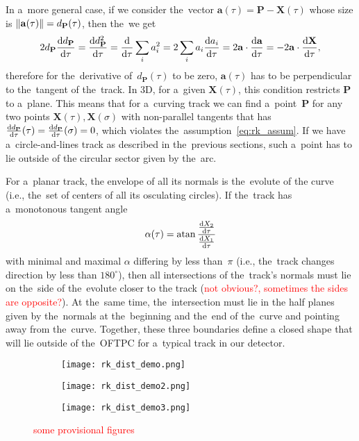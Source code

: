 		In a~more general case, if we consider the~vector $\mathbf{a}(\tau) = \mathbf{P}-\mathbf{X}(\tau)$ whose size is $\norm{\mathbf{a}(\tau)} = d_\mathbf{P}(\tau)$, then the~we get
			\begin{equation}
				2d_{\mathbf{P}}\dv{d_{\mathbf{P}}}{\tau}= \dv{d^2_{\mathbf{P}}}{\tau} = \dv{}{\tau} \sum_i a_i^2 = 2\sum_i a_i\dv{a_i}{\tau} = 2\mathbf{a}\cdot\dv{\mathbf{a}}{\tau} = -2\mathbf{a}\cdot\dv{\mathbf{X}}{\tau},
			\end{equation}
		therefore for the~derivative of~$d_\mathbf{P}(\tau)$ to be zero, $\mathbf{a}(\tau)$ has to be perpendicular to the~tangent of the~track. In 3D, for a~given $\mathbf{X}(\tau)$, this condition restricts $\mathbf{P}$ to a~plane. This means that for a~curving track we can find a~point~$\mathbf{P}$ for any two points $\mathbf{X}(\tau),\mathbf{X}(\sigma)$ with non-parallel tangents that has $\dv{d_{\mathbf{P}}}{\tau}{(\tau)} = \dv{d_{\mathbf{P}}}{\tau}{(\sigma)} = 0$, which violates the~assumption~\ref{eq:rk_assum}. If we have a~circle-and-lines track as described in the~previous sections, such a~point has to lie outside of the circular sector given by the~arc.
		
		For a~planar track, the envelope of all its normals is the~evolute of the curve (i.e., the~set of centers of all its osculating circles). If the~track has a~monotonous tangent angle
			\begin{equation}
				\alpha(\tau) = \atan{\frac{\dv{X_2}{\tau}}{\dv{X_1}{\tau}}}
			\end{equation}
		with minimal and maximal $\alpha$ differing by less than~$\pi$ (i.e., the~track changes direction by less than $180^\circ$), then all intersections of the~track's normals must lie on the~side of the~evolute closer to the track (\textcolor{red}{not obvious?, sometimes the sides are opposite?}). At the~same time, the~intersection must lie in the half planes given by the~normals at the~beginning and the~end of the~curve and pointing away from the~curve. Together, these three boundaries define a closed shape that will lie outside of the~\ac{OFTPC} for a~typical track in our detector.
			\begin{figure}
				\centering
				\begin{subfigure}[t]{0.49\textwidth}
					\centering
					\texttt{[image: rk\_dist\_demo.png]}
				\end{subfigure}
				\hfill
				\begin{subfigure}[t]{0.49\textwidth}
					\centering
					\texttt{[image: rk\_dist\_demo2.png]}
				\end{subfigure}
				\hfill
				\begin{subfigure}[t]{0.49\textwidth}
					\centering
					\texttt{[image: rk\_dist\_demo3.png]}
				\end{subfigure}
				\caption{\textcolor{red}{some provisional figures}}
				\label{fig:rkdemo2}
			\end{figure}
		
